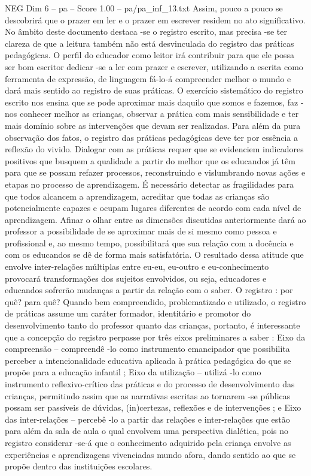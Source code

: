 \begin{textsample}{NEG Dim 6 – pa – Score 1.00 – pa/pa\_inf\_13.txt}
Assim, pouco a pouco se descobrirá que o prazer em ler e o prazer em escrever residem no ato significativo.
No âmbito deste documento destaca -se o registro escrito, mas precisa -se ter clareza de que a leitura também não está desvinculada do registro das práticas pedagógicas.
O perfil do educador como leitor irá contribuir para que ele possa ser bom escritor dedicar -se a ler com prazer e escrever, utilizando a escrita como ferramenta de expressão, de linguagem fá-lo-á compreender melhor o mundo e dará mais sentido ao registro de suas práticas.
O exercício sistemático do registro escrito nos ensina que se pode aproximar mais daquilo que somos e fazemos, faz -nos conhecer melhor as crianças, observar a prática com mais sensibilidade e ter mais domínio sobre as intervenções que devam ser realizadas.
Para além da pura observação dos fatos, o registro das práticas pedagógicas deve ter por essência a reflexão do vivido.
Dialogar com as práticas requer que se evidenciem indicadores positivos que busquem a qualidade a partir do melhor que os educandos já têm para que se possam refazer processos, reconstruindo e vislumbrando novas ações e etapas no processo de aprendizagem.
É necessário detectar as fragilidades para que todos alcancem a aprendizagem, acreditar que todas as crianças são potencialmente capazes e ocupam lugares diferentes de acordo com cada nível de aprendizagem.
Afinar o olhar entre as dimensões discutidas anteriormente dará ao professor a possibilidade de se aproximar mais de si mesmo como pessoa e profissional e, ao mesmo tempo, possibilitará que sua relação com a docência e com os educandos se dê de forma mais satisfatória.
O resultado dessa atitude que envolve inter-relações múltiplas entre eu-eu, eu-outro e eu-conhecimento provocará transformações dos sujeitos envolvidos, ou seja, educadores e educandos sofrerão mudanças a partir da relação com o saber.
O registro : por quê? para quê?
Quando bem compreendido, problematizado e utilizado, o registro de práticas assume um caráter formador, identitário e promotor do desenvolvimento tanto do professor quanto das crianças, portanto, é interessante que a concepção do registro perpasse por três eixos preliminares a saber : Eixo da compreensão – compreendê -lo como instrumento emancipador que possibilita perceber a intencionalidade educativa aplicada à prática pedagógica do que se propõe para a educação infantil ; Eixo da utilização – utilizá -lo como instrumento reflexivo-crítico das práticas e do processo de desenvolvimento das crianças, permitindo assim que as narrativas escritas ao tornarem -se públicas possam ser passíveis de dúvidas, (in)certezas, reflexões e de intervenções ; e Eixo das inter-relações – percebê -lo a partir das relações e inter-relações que estão para além da sala de aula o qual envolvem uma perspectiva dialética, pois no registro considerar -se-á que o conhecimento adquirido pela criança envolve as experiências e aprendizagens vivenciadas mundo afora, dando sentido ao que se propõe dentro das instituições escolares.

\end{textsample}
